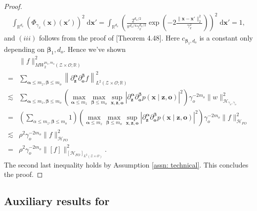 \documentclass[11pt]{article}
\newcommand{\bx}{\mathbf x}
\newcommand{\bz}{\mathbf z}
\newcommand{\bo}{\mathbf o}
\newcommand{\calZ}{\mathcal{Z}}
\newcommand{\calH}{\mathcal{H}}
\newcommand{\calO}{\mathcal{O}}
\newcommand{\R}{\mathbb{R}}
\newcommand{\0}{\mathbf{0}}
\newcommand{\balpha}{\boldsymbol\alpha}
\newcommand{\bbeta}{\boldsymbol\beta}
\begin{document}
\begin{appendix}
\begin{proof}
\begin{align*}
    \int_{\R^{d_x}}(\Phi_{\gamma_x}(\bx)(\bx'))^2\;\mathrm{d}\bx' = \int_{\R^{d_x}} \left(\frac{2^{d_x/2}}{\pi^{d_x/4}\gamma_x^{d_x/2}}\exp\left(-2\frac{\|\bx - \bx'\|^2_{2}}{\gamma_x^2}\right)\right)^2\;\mathrm{d}\bx' = 1,
\end{align*}
and $(iii)$ follows from the proof of \cite{steinwart2008support}[Theorem 4.48]. Here $c_{\bbeta_1,d_o}$ is a constant only depending on $\bbeta_1,d_o$. Hence we've shown
\begin{align*}
    &\|f\|^2_{MW^{m_z,m_o}_2(\calZ\times \calO;\R)}\\
    = & \sum_{\balpha\leq m_z, \bbeta\leq m_o}\left\|\partial^{\balpha}_{\bz}\partial^{\bbeta}_{\bo}f\right\|^2_{L^2(\calZ\times \calO;\R)}\\
    \lesssim & \sum_{\balpha \leq m_z, \bbeta\leq m_o} \left(\max_{\balpha\leq m_z}\max_{\bbeta\leq m_o}\sup_{\bx,\bz,\bo}\left|\partial^{\balpha}_{\bz}\partial^{\bbeta}_{\bo}p(\bx\mid \bz,\bo)\right|^2\right)  \gamma_o^{-2m_o} \|w\|_{\calH_{\gamma_x,\gamma_o}}^2\\
    = & \left(\sum_{\alpha \leq m_z, \bbeta\leq m_o} 1\right) \left(\max_{\balpha\leq m_z}\max_{\bbeta\leq m_o}\sup_{\bx,\bz,\bo}\left|\partial^{\balpha}_{\bz}\partial^{\bbeta}_{\bo}p(\bx\mid \bz,\bo)\right|^2\right)  \gamma_o^{-2m_o} \|f\|_{\calH_{FO}}^2 \\
    \lesssim &\rho^2 \gamma_o^{-2m_o} \|f\|_{\calH_{FO}}^2 \\
    = & \rho^2 \gamma_o^{-2m_o} \|[f]\|_{[\calH_{FO}]_{L^2(\calZ\times \calO)}}^2 .
\end{align*}
The second last inequality holds by Assumption \ref{assn: technical}.
This concludes the proof. 
\end{proof}



\subsection{Auxiliary results for }


\end{appendix}
\end{document}
